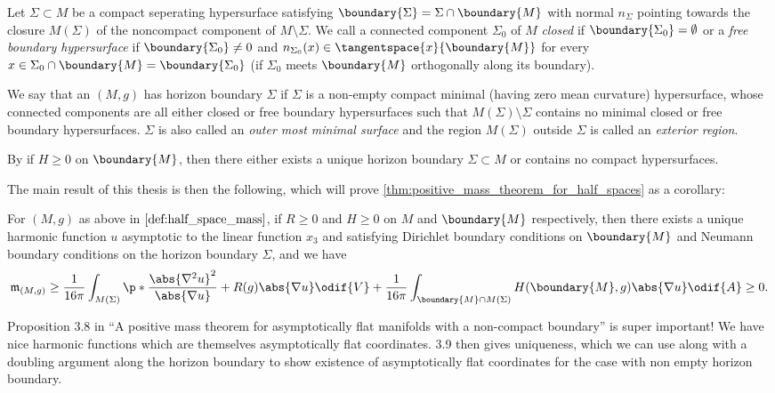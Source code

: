 \documentclass[titlepage,numbers=noenddot,headinclude,oneside,%
footinclude=true,cleardoublepage=empty,%
BCOR=5mm,paper=a4,fontsize=11pt,%
english,%
]{scrartcl}
\newcommand{\mass}[2]{\mathfrak{m}_{(#1,#2)}} %
\begin{document}
\begin{definition}
    Let \( \Sigma\subset M  \) be a compact seperating hypersurface satisfying \( \boundary{\Sigma}=\Sigma\cap \boundary{M} \) with normal \( n_\Sigma \) pointing towards the closure \( M(\Sigma) \) of the noncompact component of \( M\setminus \Sigma \). We call a connected component \( \Sigma_0 \) of \( M \) \emph{closed} if \( \boundary{\Sigma_0}=\emptyset \) or a \emph{free boundary hypersurface} if \( \boundary{\Sigma_0}\neq 0 \) and \( n_{\Sigma_0}(x)\in \tangentspace{x}{\boundary{M}} \) for every \( x\in \Sigma_0\cap \boundary{M}=\boundary{\Sigma_0} \) (\ie if \( \Sigma_0 \) meets \( \boundary{M} \) orthogonally along its boundary).

    We say that an \( (M,g) \) has horizon boundary \( \Sigma \) if \( \Sigma \) is a non-empty compact minimal (\ie having zero mean curvature) hypersurface, whose connected components are all either closed or free boundary hypersurfaces such that \( M(\Sigma)\setminus \Sigma \) contains no minimal closed or free boundary hypersurfaces. \( \Sigma \) is also called an \emph{outer most minimal surface} and the region \( M(\Sigma) \) outside \( \Sigma \) is called an \emph{exterior region}.
\end{definition}
\begin{remark}
    By \cite[Lemma 2.3]{koerberRiemannianPenroseInequality2020} if \( H\geq 0 \) on \( \boundary{M} \), then there either exists a unique horizon boundary \( \Sigma\subset M \) or contains no compact hypersurfaces.
\end{remark}
The main result of this thesis is then the following, which will prove \cref{thm:positive_mass_theorem_for_half_spaces} as a corollary:
\begin{theorem}
    For \( (M,g) \) as above in \( \cref{def:half_space_mass} \), if \( R\geq 0 \) and \( H\geq 0 \) on \( M \) and \( \boundary{M} \) respectively, then there exists a unique harmonic function \( u \) asymptotic to the linear function \( x_3 \) and satisfying Dirichlet boundary conditions on \( \boundary{M} \) and Neumann boundary conditions on the horizon boundary \( \Sigma \), and we have
    \begin{equation*}
        \mass{M}{g}\geq \frac{1}{16\pi}\int_{M(\Sigma)}\p*{\frac{\abs{\nabla^2 u}^2}{\abs{\nabla u}}+R(g)\abs{\nabla u}}\odif{V}+\frac{1}{16\pi}\int_{\boundary{M}\cap M(\Sigma)}H(\boundary{M},g)\abs{\nabla u}\odif{A}\geq 0.
    \end{equation*} 
\end{theorem} 

Proposition 3.8 in \enquote{A positive mass theorem for
asymptotically flat manifolds with
a non-compact boundary} is super important! We have nice harmonic functions which are themselves asymptotically flat coordinates. 3.9 then gives uniqueness, which we can use along with a doubling argument along the horizon boundary to show existence of asymptotically flat coordinates for the case with non empty horizon boundary.
\printbibliography
\end{document}
